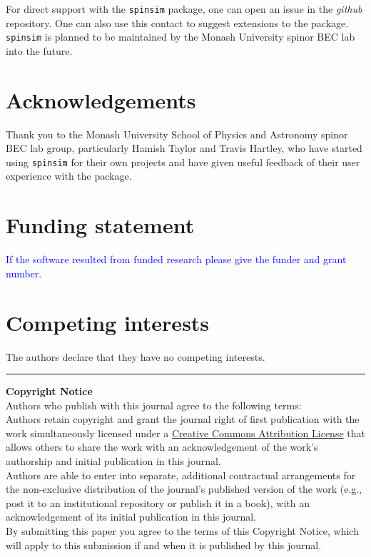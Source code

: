 \documentclass{jors}
\begin{document}
		For direct support with the \texttt{spinsim} package, one can open an issue in the \emph{github} repository. One can also use this contact to suggest extensions to the package. \texttt{spinsim} is planned to be maintained by the Monash University spinor BEC lab into the future.

\section*{Acknowledgements}

Thank you to the Monash University School of Physics and Astronomy spinor BEC lab group, particularly Hamish Taylor and Travis Hartley, who have started using \texttt{spinsim} for their own projects and have given useful feedback of their user experience with the package.

\section*{Funding statement}

\textcolor{blue}{If the software resulted from funded research please give the funder and grant number.}

\section*{Competing interests}

The authors declare that they have no competing interests.

{}


\vspace{2cm}

\rule{\textwidth}{1pt}

{ \bf Copyright Notice} \\
Authors who publish with this journal agree to the following terms: \\

Authors retain copyright and grant the journal right of first publication with the work simultaneously licensed under a  \href{http://creativecommons.org/licenses/by/3.0/}{Creative Commons Attribution License} that allows others to share the work with an acknowledgement of the work's authorship and initial publication in this journal. \\

Authors are able to enter into separate, additional contractual arrangements for the non-exclusive distribution of the journal's published version of the work (e.g., post it to an institutional repository or publish it in a book), with an acknowledgement of its initial publication in this journal. \\

By submitting this paper you agree to the terms of this Copyright Notice, which will apply to this submission if and when it is published by this journal.
\end{document}
